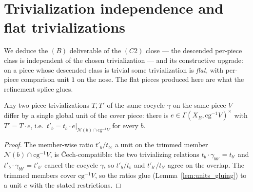 \section{Trivialization independence and flat trivializations}
\label{sec:effectivityOverlap}

We deduce the \((B)\) deliverable of the \((C2)\) close --- the descended per-piece class is
independent of the chosen trivialization --- and its constructive upgrade: on a piece whose descended
class is trivial some trivialization is \emph{flat}, with per-piece comparison unit \(1\) on the nose.
The flat pieces produced here are what the refinement splice glues.

\begin{theorem}
  \label{thm:exists_ratio_unit}
  \leanok
  Any two piece trivializations \(T, T'\) of the same cocycle \(\gamma\) on the same piece \(V\)
  differ by a single global unit of the cover piece: there is \(e \in \Gamma(X_B, \mathrm{cg}^{-1}
  V)^{\times}\) with \(T' = T \cdot e\), i.e.\ \(t'_b = t_b \cdot e|_{\mathcal N(b) \cap \mathrm{cg}
  ^{-1}V}\) for every \(b\).
\end{theorem}
\begin{proof}
  \leanok
  The member-wise ratio \(t'_b / t_b\), a unit on the trimmed member \(\mathcal N(b) \cap \mathrm{cg}
  ^{-1}V\), is \v Cech-compatible: the two trivializing relations \(t_b \cdot \gamma_{b b'} =
  t_{b'}\) and \(t'_b \cdot \gamma_{b b'} = t'_{b'}\) cancel the cocycle \(\gamma\), so \(t'_b/t_b\)
  and \(t'_{b'}/t_{b'}\) agree on the overlap. The trimmed members cover \(\mathrm{cg}^{-1}V\), so the
  ratios glue (Lemma~\ref{lem:units_gluing}) to a unit \(e\) with the stated restrictions.
\end{proof}

